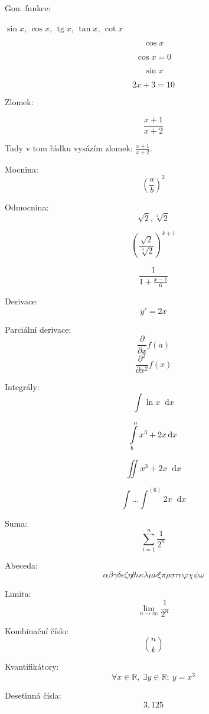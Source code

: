 \documentclass[a4paper, 12pt]{article}
\newcommand*\diff{\mathop{}\!\mathrm{d}}
\DeclareMathOperator{\tg}{tg}
\begin{document}
Gon. funkce:

$\sin{x}$, $\cos{x}$, $\tg{x}$, $\tan{x}$, $\cot{x}$

$$ \cos{x} $$

\begin{equation*}
    \cos{x} = 0
\end{equation*}


\begin{equation}
    \sin{x}
\end{equation}

\begin{equation}
    2x + 3 = 10
\end{equation}

Zlomek:

\begin{equation}
    \frac{x + 1}{x + 2}
\end{equation}

Tady v tom řádku vysázím zlomek: $\frac{x + 1}{x + 2}$.

Mocnina:
$$ \left(\frac{a}{b}\right)^2 $$

Odmocnina:
$$ \sqrt{2}, \sqrt[3]{2} $$

$$ \left(
    \frac{\sqrt{2}}{\sqrt[3]{2}}
    \right)^{k + 1} $$

$$ \frac{1}{1 + \frac{x - 1}{6}} $$

Derivace:
$$ y'=2x $$

Parciální derivace:
$$ \frac{\partial}{\partial x} f(a)$$
$$ \frac{\partial^2}{\partial x^2} f(x)$$

Integrály:
$$ \int \ln{x} \diff{x} $$

$$ \int_{b}^{a}\limits x^3 + 2x \diff{x} $$  %

$$ \iint x^3 + 2x \diff{x} $$

$$ \int \dots \int^{(6)} 2x \diff{x} $$


Suma:
$$ \sum_{i=1}^{n}  \frac{1}{2^n} $$

Abeceda:
$$ \alpha \beta \gamma \delta \epsilon \zeta \eta \theta \iota \kappa \lambda \mu \nu \xi \pi \rho \sigma \tau \upsilon \varphi \chi \psi \omega  $$

Limita:
$$ \lim_{n \to \infty} \frac{1}{2^n} $$

Kombinační číslo:
$$ \binom{n}{k} $$

Kvantifikátory:
$$ \forall{x} \in \mathbb{R},\ \exists{y} \in \mathbb{R}; \ y = x ^ 3$$

Desetinná čísla:
$$ 3{,}125 $$
\end{document}
